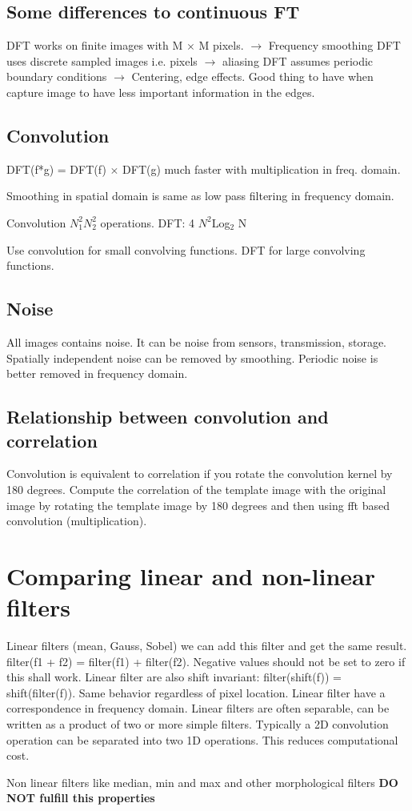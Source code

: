\subsection*{Some differences to continuous FT}
DFT works on finite images with M $\times$ M pixels. $\rightarrow$ Frequency smoothing
DFT uses discrete sampled images i.e. pixels $\rightarrow$ aliasing
DFT assumes periodic boundary conditions $\rightarrow$ Centering, edge effects. Good thing to have when capture image to have less important information in the edges. 
 

\subsection*{Convolution}
DFT(f*g) = DFT(f) $\times$ DFT(g) much faster with multiplication in freq. domain. 

Smoothing in spatial domain is same as low pass filtering in frequency domain.

Convolution $N_1^{2}N_2^{2}$ operations. 
DFT: 4 $N^{2}$Log$_2$ N

Use convolution for small convolving functions. DFT for large convolving functions.

\subsection*{Noise}
All images contains noise. It can be noise from sensors, transmission, storage. Spatially independent noise can be removed by smoothing. Periodic noise is better removed in frequency domain.

\subsection*{Relationship between convolution and correlation}
Convolution is equivalent to correlation if you rotate the convolution kernel by 180 degrees. Compute the correlation of the template image with the original image by rotating the template image by 180 degrees and then using fft based convolution (multiplication).


\section{Comparing linear and non-linear filters}
Linear filters (mean, Gauss, Sobel) we can add this filter and get the same result. filter(f1 + f2) = filter(f1) + filter(f2). Negative values should not be set to zero if this shall work. Linear filter are also shift invariant: filter(shift(f)) = shift(filter(f)). Same behavior regardless of pixel location. Linear filter have a correspondence in frequency domain. Linear filters are often separable, can be written as a product of two or more simple filters. Typically a 2D convolution operation can be separated into two 1D operations. This reduces computational cost. 

Non linear filters like median, min and max and other morphological filters \textbf{DO NOT fulfill this properties}  


